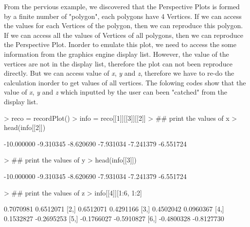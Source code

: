 \documentclass[a4paper,10pt]{article}
\begin{document}
From the pervious example, we discovered that the Perspective Plots is formed by a finite number of "polygon", each polygons have 4 Vertices. If we can access the values for each Vertices of the polygon, then we can reproduce this polygon. If we can access all the values of Vertices of all polygons, then we can reproduce the Perspective Plot. 
Inorder to emulate this plot, we need to access the some information from the graphics engine display list. However, the value of the vertices are not in the display list, therefore the plot can not been reproduce directly. But we can access value of \emph{x}, \emph{y} and \emph{z}, therefore we have to re-do the calculation inorder to get values of all vertices. The folowing codes show that the value of \emph{x}, \emph{y} and \emph{z} which inputted by the user can been "catched" from the display list.

\begin{Schunk}
\begin{Sinput}
> reco = recordPlot()
> info = reco[[1]][[3]][[2]]
> ## print the values of x
> head(info[[2]])
\end{Sinput}
\begin{Soutput}
[1] -10.000000  -9.310345  -8.620690  -7.931034  -7.241379  -6.551724
\end{Soutput}
\begin{Sinput}
> ## print the values of y
> head(info[[3]])
\end{Sinput}
\begin{Soutput}
[1] -10.000000  -9.310345  -8.620690  -7.931034  -7.241379  -6.551724
\end{Soutput}
\begin{Sinput}
> ## print the values of z
> info[[4]][1:6, 1:2]
\end{Sinput}
\begin{Soutput}
           [,1]       [,2]
[1,]  0.7070981  0.6512071
[2,]  0.6512071  0.4291166
[3,]  0.4502042  0.0960367
[4,]  0.1532827 -0.2695253
[5,] -0.1766027 -0.5910827
[6,] -0.4800328 -0.8127730
\end{Soutput}
\end{Schunk}
\end{document}
